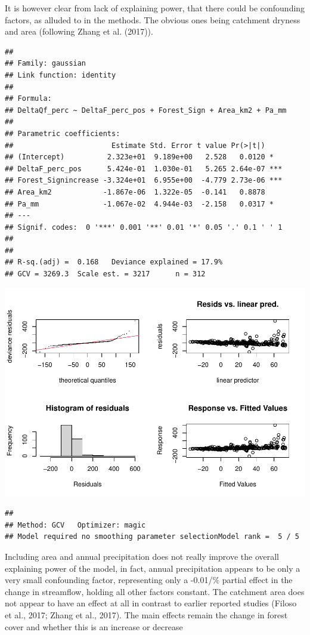 \documentclass[]{elsarticle} %
\begin{document}
It is however clear from lack of explaining power, that there could be
confounding factors, as alluded to in the methods. The obvious ones
being catchment dryness and area (following Zhang et al. (2017)).

\begin{verbatim}
## 
## Family: gaussian 
## Link function: identity 
## 
## Formula:
## DeltaQf_perc ~ DeltaF_perc_pos + Forest_Sign + Area_km2 + Pa_mm
## 
## Parametric coefficients:
##                       Estimate Std. Error t value Pr(>|t|)    
## (Intercept)          2.323e+01  9.189e+00   2.528   0.0120 *  
## DeltaF_perc_pos      5.424e-01  1.030e-01   5.265 2.64e-07 ***
## Forest_Signincrease -3.324e+01  6.955e+00  -4.779 2.73e-06 ***
## Area_km2            -1.867e-06  1.322e-05  -0.141   0.8878    
## Pa_mm               -1.067e-02  4.944e-03  -2.158   0.0317 *  
## ---
## Signif. codes:  0 '***' 0.001 '**' 0.01 '*' 0.05 '.' 0.1 ' ' 1
## 
## 
## R-sq.(adj) =  0.168   Deviance explained = 17.9%
## GCV = 3269.3  Scale est. = 3217      n = 312
\end{verbatim}

\includegraphics{Forest_and_Water_files/figure-latex/model2-1.pdf}

\begin{verbatim}
## 
## Method: GCV   Optimizer: magic
## Model required no smoothing parameter selectionModel rank =  5 / 5
\end{verbatim}

Including area and annual precipitation does not really improve the
overall explaining power of the model, in fact, annual precipitation
appears to be only a very small confounding factor, representing only a
-0.01/\% partial effect in the change in streamflow, holding all other
factors constant. The catchment area does not appear to have an effect
at all in contrast to earlier reported studies (Filoso et al., 2017;
Zhang et al., 2017). The main effects remain the change in forest cover
and whether this is an increase or decrease
\end{document}
